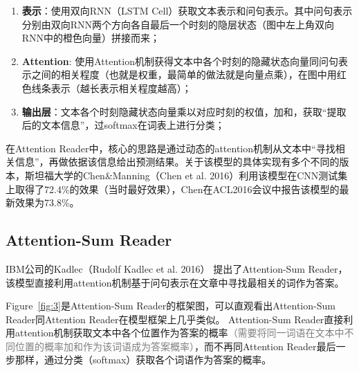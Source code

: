 \documentclass[11pt]{article}
\begin{document}
\begin{enumerate}
    \item {\bf 表示}：使用双向RNN（LSTM Cell）获取文本表示和问句表示。其中问句表示分别由双向RNN两个方向各自最后一个时刻的隐层状态（图中左上角双向RNN中的橙色向量）拼接而来；
    \item  {\bf Attention}: 使用Attention机制获得文本中各个时刻的隐藏状态向量同问句表示之间的相关程度（也就是权重，最简单的做法就是向量点乘），在图中用红色线条表示（越长表示相关程度越高）；
    \item  {\bf  输出层}：文本各个时刻隐藏状态向量乘以对应时刻的权值，加和，获取“提取后的文本信息”，过softmax在词表上进行分类；
\end{enumerate}

在Attention Reader中，核心的思路是通过动态的attention机制从文本中“寻找相关信息”，再做依据该信息给出预测结果。关于该模型的具体实现有多个不同的版本，斯坦福大学的Chen\&Manning（Chen et al. 2016）\cite{chen2016thorough}利用该模型在CNN测试集上取得了72.4\%的效果（当时最好效果），Chen在ACL2016会议中报告该模型的最新效果为73.8\%。

\subsection{Attention-Sum Reader}
IBM公司的Kadlec（Rudolf Kadlec et al. 2016）\cite{kadlec2016text} 提出了Attention-Sum Reader，该模型直接利用attention机制基于问句表示在文章中寻找最相关的词作为答案。

Figure~\ref{fig:3}是Attention-Sum Reader的框架图，可以直观看出Attention-Sum Reader同Attention Reader在模型框架上几乎类似。
Attention-Sum Reader直接利用attention机制获取文本中各个位置作为答案的概率\textcolor{gray}{（需要将同一词语在文本中不同位置的概率加和作为该词语成为答案概率）}，而不再同Attention Reader最后一步那样，通过分类（softmax）获取各个词语作为答案的概率。
\end{document}
